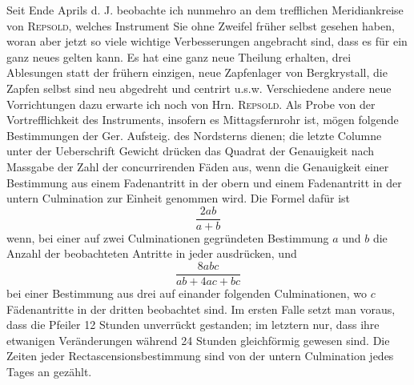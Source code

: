 \par\indent Seit Ende Aprils d. J. beobachte ich nunmehro an dem trefflichen Meridiankreise von \textsc{Repsold}, welches Instrument Sie ohne Zweifel früher selbst gesehen haben, woran aber jetzt so viele wichtige Verbesserungen angebracht sind, dass es für ein ganz neues gelten kann. Es hat eine ganz neue Theilung erhalten, drei Ablesungen statt der frühern einzigen, neue Zapfenlager von Bergkrystall, die Zapfen selbst sind neu abgedreht und centrirt u.s.w. Verschiedene andere neue Vorrichtungen dazu erwarte ich noch von Hrn. \textsc{Repsold}. Als Probe von der Vortrefflichkeit des Instruments, insofern es Mittagsfernrohr ist, mögen folgende Bestimmungen der Ger. Aufsteig. des Nordsterns dienen; die letzte Columne unter der Ueberschrift Gewicht drücken das Quadrat der Genauigkeit nach Massgabe der Zahl der concurrirenden Fäden aus, wenn die Genauigkeit einer Bestimmung aus einem Fadenantritt in der obern und einem Fadenantritt in der untern Culmination zur Einheit genommen wird. Die Formel dafür ist
\[
\frac{2ab}{a+b}
\]
\noindent wenn, bei einer auf zwei Culminationen gegründeten Bestimmung $a$ und $b$ die Anzahl der beobachteten Antritte in jeder ausdrücken, und
\[
\frac{8abc}{ab+4ac+bc}
\]
\noindent bei einer Bestimmung aus drei auf einander folgenden Culminationen, wo $c$ Fädenantritte in der dritten beobachtet sind. Im ersten Falle setzt man voraus, dass die Pfeiler 12 Stunden unverrückt gestanden; im letztern nur, dass ihre etwanigen Veränderungen während 24 Stunden gleichförmig gewesen sind. Die Zeiten jeder Rectascensionsbestimmung sind von der untern Culmination jedes Tages an gezählt.

